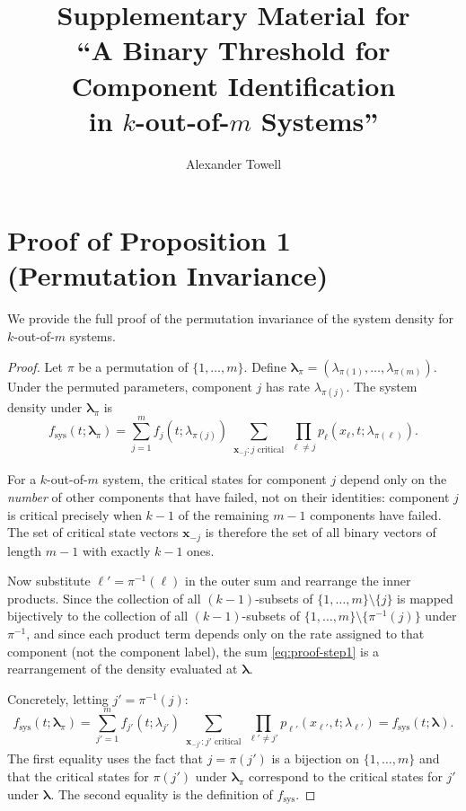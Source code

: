 \documentclass[12pt]{article}
\title{Supplementary Material for\\
  ``A Binary Threshold for Component Identification\\
  in $k$-out-of-$m$ Systems''}
\author{Alexander Towell}
\date{}
\newcommand{\fsys}{f_{\mathrm{sys}}}
\newcommand{\blambda}{\boldsymbol{\lambda}}
\newcommand{\bx}{\mathbf{x}}
\begin{document}
\maketitle

\appendix

\section{Proof of Proposition 1 (Permutation Invariance)}
\label{sec:proof-symmetry}

We provide the full proof of the permutation invariance of the system
density for $k$-out-of-$m$ systems.

\begin{proof}
Let $\pi$ be a permutation of $\{1, \ldots, m\}$.  Define
$\blambda_\pi = (\lambda_{\pi(1)}, \ldots, \lambda_{\pi(m)})$.  Under
the permuted parameters, component $j$ has rate $\lambda_{\pi(j)}$.
The system density under $\blambda_\pi$ is
\begin{equation}\label{eq:proof-step1}
  \fsys(t; \blambda_\pi) = \sum_{j=1}^{m} f_j(t; \lambda_{\pi(j)})
    \sum_{\substack{\bx_{-j}: j \text{ critical}}}
    \prod_{\ell \neq j} p_\ell(x_\ell, t; \lambda_{\pi(\ell)}).
\end{equation}

For a $k$-out-of-$m$ system, the critical states for component $j$ depend
only on the \emph{number} of other components that have failed, not on
their identities: component $j$ is critical precisely when $k - 1$ of the
remaining $m - 1$ components have failed.  The set of critical state
vectors $\bx_{-j}$ is therefore the set of all binary vectors of length
$m - 1$ with exactly $k - 1$ ones.

Now substitute $\ell' = \pi^{-1}(\ell)$ in the outer sum and rearrange
the inner products.  Since the collection of all $(k-1)$-subsets of
$\{1, \ldots, m\} \setminus \{j\}$ is mapped bijectively to the
collection of all $(k-1)$-subsets of $\{1, \ldots, m\} \setminus
\{\pi^{-1}(j)\}$ under $\pi^{-1}$, and since each product term depends
only on the rate assigned to that component (not the component label),
the sum \eqref{eq:proof-step1} is a rearrangement of the density
evaluated at $\blambda$.

Concretely, letting $j' = \pi^{-1}(j)$:
\[
  \fsys(t; \blambda_\pi)
  = \sum_{j'=1}^{m} f_{j'}(t; \lambda_{j'})
    \sum_{\substack{\bx_{-j'}: j' \text{ critical}}}
    \prod_{\ell' \neq j'} p_{\ell'}(x_{\ell'}, t; \lambda_{\ell'})
  = \fsys(t; \blambda).
\]
The first equality uses the fact that $j = \pi(j')$ is a bijection on
$\{1, \ldots, m\}$ and that the critical states for $\pi(j')$ under
$\blambda_\pi$ correspond to the critical states for $j'$ under
$\blambda$.  The second equality is the definition of $\fsys$.
\end{proof}
\end{document}
